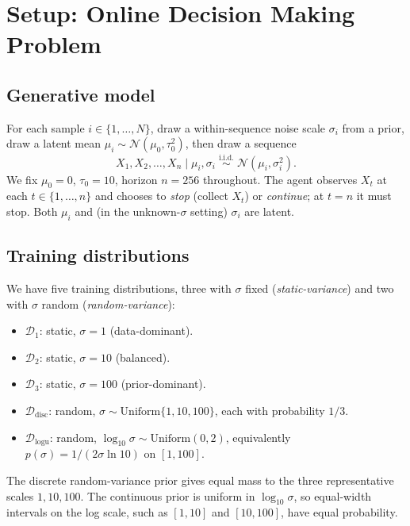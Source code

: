 \documentclass[11pt]{article}
\begin{document}
\section{Setup: Online Decision Making Problem}
\label{sec:setup}

\subsection{Generative model}

For each sample $i \in \{1, \ldots, N\}$, draw a within-sequence noise scale $\sigma_i$ from a prior, draw a latent mean $\mu_i \sim \mathcal{N}(\mu_0, \tau_0^2)$, then draw a sequence
\[
X_1, X_2, \ldots, X_n \mid \mu_i, \sigma_i \;\overset{\text{i.i.d.}}{\sim}\; \mathcal{N}(\mu_i, \sigma_i^2).
\]
We fix $\mu_0 = 0$, $\tau_0 = 10$, horizon $n = 256$ throughout. The agent observes $X_t$ at each $t \in \{1, \ldots, n\}$ and chooses to \emph{stop} (collect $X_t$) or \emph{continue}; at $t = n$ it must stop. Both $\mu_i$ and (in the unknown-$\sigma$ setting) $\sigma_i$ are latent.

\subsection{Training distributions}

We have five training distributions, three with $\sigma$ fixed (\emph{static-variance}) and two with $\sigma$ random (\emph{random-variance}):
\begin{itemize}
\item $\mathcal{D}_1$: static, $\sigma = 1$ (data-dominant).
\item $\mathcal{D}_2$: static, $\sigma = 10$ (balanced).
\item $\mathcal{D}_3$: static, $\sigma = 100$ (prior-dominant).
\item $\mathcal{D}_{\mathrm{disc}}$: random, $\sigma \sim \mathrm{Uniform}\{1, 10, 100\}$, each with probability $1/3$.
\item $\mathcal{D}_{\mathrm{logu}}$: random, $\log_{10}\sigma \sim \mathrm{Uniform}(0, 2)$, equivalently $p(\sigma) = 1/(2\sigma\ln 10)$ on $[1, 100]$.
\end{itemize}
The discrete random-variance prior gives equal mass to the three representative scales \(1,10,100\). The continuous prior is uniform in \(\log_{10}\sigma\), so equal-width intervals on the log scale, such as \([1,10]\) and \([10,100]\), have equal probability.
\end{document}
